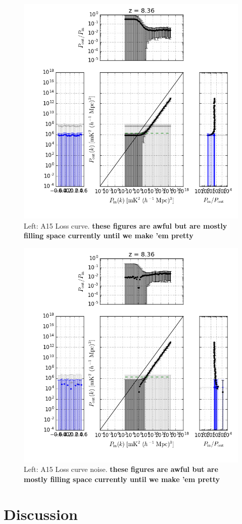 \documentclass[preprint2,hidelinks]{emulateapj}
\begin{document}
\begin{figure}[t]
\centering
\includegraphics[width=.45\textwidth]{ali_reconstruction_loss_curve.png}
\caption{Left: A15 Loss curve. %
{\bf \color{red} these figures are awful but are mostly filling space currently until we make 'em pretty} \label{fig:sigloss_data}}

\end{figure}


\begin{figure}[t]
\centering
\includegraphics[width=.45\textwidth]{ali_noise_loss_curve.png}
\caption{Left: A15 Loss curve noise. %
{\bf \color{red} these figures are awful but are mostly filling space currently until we make 'em pretty} \label{fig:sigloss_noise}}
\end{figure}


\section{Discussion}\label{sec:discussion}{

}



\end{document}
